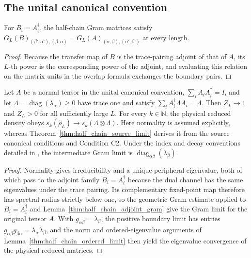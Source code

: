 \subsection{The unital canonical convention}

\begin{lemma}%
    \label{thm:half_chain_adjoint_gram}
    \leanok
    For $B_i=A_i^\dagger$, the half-chain Gram matrices satisfy
    $G_L(B)_{(\beta',\alpha'),(\beta,\alpha)}
        =G_L(A)_{(\alpha,\beta),(\alpha',\beta')}$ at every length.
\end{lemma}

\begin{proof}
    \leanok
    Because the transfer map of $B$ is the trace-pairing adjoint of that of
    $A$, its $L$-th power is the corresponding power of the adjoint, and
    evaluating this relation on the matrix units in the overlap formula
    exchanges the boundary pairs.
\end{proof}

\begin{lemma}%
    \label{thm:half_chain_unital_limit}
    \leanok
    Let $A$ be a normal tensor in the unital canonical convention,
    $\sum_i A_iA_i^\dagger=I$, and let
    $\Lambda=\operatorname{diag}(\lambda_\alpha)\geq0$ have trace one and
    satisfy $\sum_i A_i^\dagger\Lambda A_i=\Lambda$.
    Then $Z_L\to1$ and $Z_L>0$ for all sufficiently large $L$.
    For every $k\in\mathbb N$, the physical reduced density obeys
    $s_k(\widehat\rho_L)\to s_k(\Lambda\otimes\Lambda)$.
    Here normality is assumed explicitly, whereas
    Theorem~\ref{thm:half_chain_source_limit} derives it from the source
    canonical conditions and Condition C2.
    Under the index and decay conventions detailed in
    \cite{gap:pgvwc07_half_chain_spectrum_conventions}, the intermediate Gram
    limit is $\operatorname{diag}_{\alpha\beta}(\lambda_\beta)$.
\end{lemma}

\begin{proof}
    \leanok
    Normality gives irreducibility and a unique peripheral eigenvalue, both of
    which pass to the adjoint family $B_i=A_i^\dagger$ because the dual channel
    has the same eigenvalues under the trace pairing. Its complementary
    fixed-point map therefore has spectral radius strictly below one, so the
    geometric Gram estimate applied to $B_i=A_i^\dagger$ and
    Lemma~\ref{thm:half_chain_adjoint_gram} give the Gram limit for the
    original tensor $A$. With $g_{\alpha\beta}=\lambda_\beta$, the positive
    boundary limit has entries $g_{\alpha\beta}g_{\beta\alpha}
        =\lambda_\alpha\lambda_\beta$, and the norm and ordered-eigenvalue
    arguments of Lemma~\ref{thm:half_chain_ordered_limit} then yield the
    eigenvalue convergence of the physical reduced matrices.
\end{proof}


